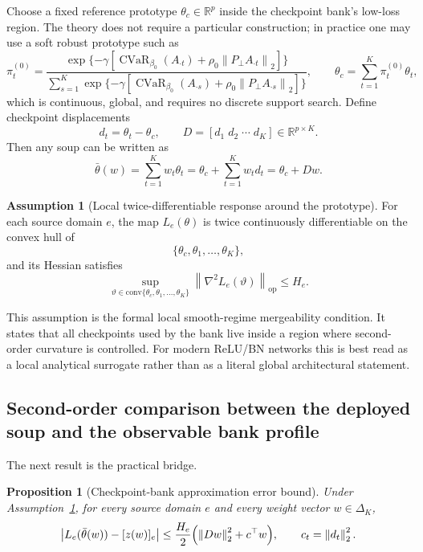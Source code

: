 \documentclass[11pt]{article}
\newcommand{\R}{\mathbb{R}}
\newcommand{\1}{\mathbf{1}}
\newcommand{\cvar}{\operatorname{CVaR}}
\newcommand{\norm}[1]{\left\lVert #1 \right\rVert}
\newcommand{\abs}[1]{\left\lvert #1 \right\rvert}
\newcommand{\Dset}{\Delta_K}
\newcommand{\Pperp}{P_\perp}
\theoremstyle{plain}
\newtheorem{proposition}[theorem]{Proposition}
\theoremstyle{definition}
\newtheorem{assumption}[theorem]{Assumption}
\theoremstyle{remark}
\begin{document}
Choose a fixed reference prototype $\theta_c \in \R^p$ inside the checkpoint bank's low-loss region. The theory does not require a particular construction; in practice one may use a soft robust prototype such as
\[
\pi_t^{(0)} = \frac{\exp\{-\gamma[\cvar_{\beta_0}(A_{\cdot t}) + \rho_0\norm{\Pperp A_{\cdot t}}_2]\}}{\sum_{s=1}^K \exp\{-\gamma[\cvar_{\beta_0}(A_{\cdot s}) + \rho_0\norm{\Pperp A_{\cdot s}}_2]\}},
\qquad
\theta_c = \sum_{t=1}^K \pi_t^{(0)} \theta_t,
\]
which is continuous, global, and requires no discrete support search. Define checkpoint displacements
\[
d_t = \theta_t - \theta_c, \qquad D = [d_1\; d_2\; \cdots\; d_K] \in \R^{p \times K}.
\]
Then any soup can be written as
\[
\bar\theta(w) = \sum_{t=1}^K w_t \theta_t = \theta_c + \sum_{t=1}^K w_t d_t = \theta_c + Dw.
\]

\begin{assumption}[Local twice-differentiable response around the prototype]\label{ass:smooth_local}
For each source domain $e$, the map $L_e(\theta)$ is twice continuously differentiable on the convex hull of
\[
\{\theta_c, \theta_1, \dots, \theta_K\},
\]
and its Hessian satisfies
\[
\sup_{\vartheta \in \mathrm{conv}\{\theta_c,\theta_1,\dots,\theta_K\}} \norm{\nabla^2 L_e(\vartheta)}_{\mathrm{op}} \le H_e.
\]
\end{assumption}

This assumption is the formal local smooth-regime mergeability condition. It states that all checkpoints used by the bank live inside a region where second-order curvature is controlled. For modern ReLU/BN networks this is best read as a local analytical surrogate rather than as a literal global architectural statement.

\subsection{Second-order comparison between the deployed soup and the observable bank profile}
The next result is the practical bridge.

\begin{proposition}[Checkpoint-bank approximation error bound]\label{prop:bank_gap}
Under Assumption~\ref{ass:smooth_local}, for every source domain $e$ and every weight vector $w \in \Dset$,
\[
\abs{L_e(\bar\theta(w)) - [z(w)]_e}
\le \frac{H_e}{2}\Bigl(\norm{Dw}_2^2 + c^\top w\Bigr),
\qquad
c_t = \norm{d_t}_2^2.
\]
\end{proposition}
\end{document}
